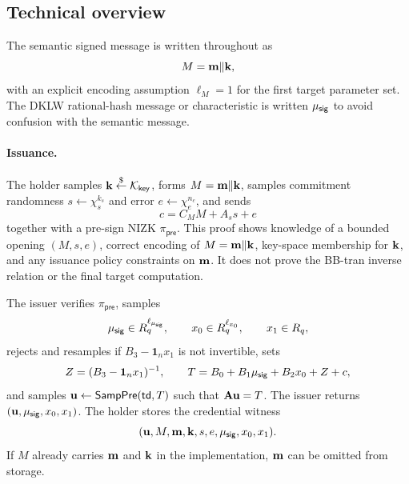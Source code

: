 \subsection{Technical overview}
The semantic signed message is written throughout as
\[
  M=\mathbf{m}\Vert\mathbf{k},
\]
with an explicit encoding assumption \(\ell_M=1\) for the first target parameter set.  The DKLW rational-hash
message or characteristic is written \(\mu_{\mathsf{sig}}\) to avoid confusion with the semantic message.

\paragraph*{Issuance.}
The holder samples \(\mathbf{k}\overset{\$}{\leftarrow}\mathcal K_{\mathsf{key}}\), forms \(M=\mathbf{m}\Vert\mathbf{k}\), samples commitment
randomness \(s\leftarrow\chi_s^{k_s}\) and error \(e\leftarrow\chi_e^{n_c}\), and sends
\[
  c=C_M M+A_s s+e
\]
together with a pre-sign NIZK \(\pi_{\mathsf{pre}}\).  This proof shows knowledge of a bounded opening
\((M,s,e)\), correct encoding of \(M=\mathbf{m}\Vert\mathbf{k}\), key-space membership for \(\mathbf{k}\), and any issuance
policy constraints on \(\mathbf{m}\).  It does not prove the BB-tran inverse relation or the final target computation.

The issuer verifies \(\pi_{\mathsf{pre}}\), samples
\[
  \mu_{\mathsf{sig}}\in R_q^{\ell_{\mu_{\mathsf{sig}}}},\qquad
  x_0\in R_q^{\ell_{x_0}},\qquad
  x_1\in R_q,
\]
rejects and resamples if \(B_3-\mathbf 1_nx_1\) is not invertible, sets
\[
  Z=(B_3-\mathbf 1_nx_1)^{-1},
  \qquad
  T=B_0+B_1\mu_{\mathsf{sig}}+B_2x_0+Z+c,
\]
and samples \(\mathbf{u}\gets\mathsf{SampPre}(\mathsf{td},T)\) such that \(\mathbf{A}\mathbf{u}=T\).  The issuer returns
\((\mathbf{u},\mu_{\mathsf{sig}},x_0,x_1)\).  The holder stores the credential witness
\[
  (\mathbf{u},M,\mathbf{m},\mathbf{k},s,e,\mu_{\mathsf{sig}},x_0,x_1).
\]
If \(M\) already carries \(\mathbf{m}\) and \(\mathbf{k}\) in the implementation, \(\mathbf{m}\) can be omitted from storage.

